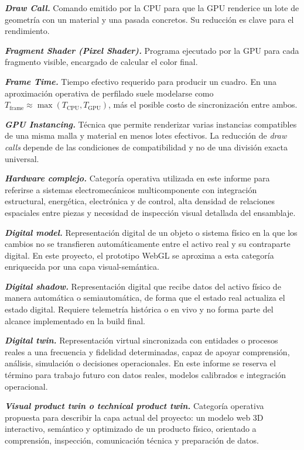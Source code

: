 \textbf{\textit{Draw Call.}} Comando emitido por la CPU para que la GPU renderice un lote de geometría con un material y una pasada concretos. Su reducción es clave para el rendimiento.

\textbf{\textit{Fragment Shader (Pixel Shader).}} Programa ejecutado por la GPU para cada fragmento visible, encargado de calcular el color final.

\textbf{\textit{Frame Time.}} Tiempo efectivo requerido para producir un cuadro. En una aproximación operativa de perfilado suele modelarse como $T_{\text{frame}} \approx \max(T_{\text{CPU}}, T_{\text{GPU}})$, más el posible costo de sincronización entre ambos.

\textbf{\textit{GPU Instancing.}} Técnica que permite renderizar varias instancias compatibles de una misma malla y material en menos lotes efectivos. La reducción de \textit{draw calls} depende de las condiciones de compatibilidad y no de una división exacta universal.

\textbf{\textit{Hardware complejo.}} Categoría operativa utilizada en este informe para referirse a sistemas electromecánicos multicomponente con integración estructural, energética, electrónica y de control, alta densidad de relaciones espaciales entre piezas y necesidad de inspección visual detallada del ensamblaje.

\textbf{\textit{Digital model.}} Representación digital de un objeto o sistema físico en la que los cambios no se transfieren automáticamente entre el activo real y su contraparte digital. En este proyecto, el prototipo WebGL se aproxima a esta categoría enriquecida por una capa visual-semántica.

\textbf{\textit{Digital shadow.}} Representación digital que recibe datos del activo físico de manera automática o semiautomática, de forma que el estado real actualiza el estado digital. Requiere telemetría histórica o en vivo y no forma parte del alcance implementado en la build final.

\textbf{\textit{Digital twin.}} Representación virtual sincronizada con entidades o procesos reales a una frecuencia y fidelidad determinadas, capaz de apoyar comprensión, análisis, simulación o decisiones operacionales. En este informe se reserva el término para trabajo futuro con datos reales, modelos calibrados e integración operacional.

\textbf{\textit{Visual product twin o technical product twin.}} Categoría operativa propuesta para describir la capa actual del proyecto: un modelo web 3D interactivo, semántico y optimizado de un producto físico, orientado a comprensión, inspección, comunicación técnica y preparación de datos.


